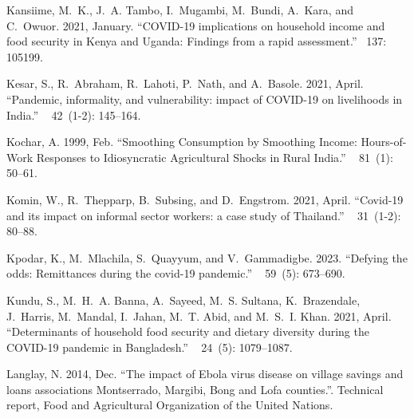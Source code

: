 \documentclass{wber}
\begin{document}
\begin{thebibliography}{}
Kansiime, M.~K., J.~A. Tambo, I.~Mugambi, M.~Bundi, A.~Kara, and C.~Owuor.
  2021, January.
\newblock ``{COVID}-19 implications on household income and food security in
  {Kenya} and {Uganda}: {Findings} from a rapid assessment.''
~{137}: 105199.

Kesar, S., R.~Abraham, R.~Lahoti, P.~Nath, and A.~Basole. 2021, April.
\newblock ``Pandemic, informality, and vulnerability: impact of {COVID}-19 on
  livelihoods in {India}.''
~{ 42\/}~(1-2): 145--164.

Kochar, A. 1999, Feb.
\newblock ``{Smoothing Consumption by Smoothing Income: Hours-of-Work Responses
  to Idiosyncratic Agricultural Shocks in Rural India}.''
~{ 81\/}~(1): 50--61.

Komin, W., R.~Thepparp, B.~Subsing, and D.~Engstrom. 2021, April.
\newblock ``Covid-19 and its impact on informal sector workers: a case study of
  {Thailand}.''
~{
  31\/}~(1-2): 80--88.

Kpodar, K., M.~Mlachila, S.~Quayyum, and V.~Gammadigbe. 2023.
\newblock ``Defying the odds: Remittances during the covid-19 pandemic.''
~{ 59\/}~(5): 673--690.

Kundu, S., M.~H.~A. Banna, A.~Sayeed, M.~S. Sultana, K.~Brazendale, J.~Harris,
  M.~Mandal, I.~Jahan, M.~T. Abid, and M.~S.~I. Khan. 2021, April.
\newblock ``Determinants of household food security and dietary diversity
  during the {COVID}-19 pandemic in {Bangladesh}.''
~{ 24\/}~(5): 1079--1087.

Langlay, N. 2014, Dec.
\newblock ``The impact of {Ebola} virus disease on village savings and loans
  associations {Montserrado}, {Margibi}, {Bong} and {Lofa} counties.''.
\newblock Technical report, {Food and Agricultural Organization of the United
  Nations}.


\end{thebibliography}
\end{document}
